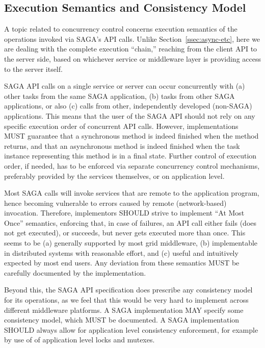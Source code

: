 

  \subsection{Execution Semantics and Consistency Model}

   A topic related to concurrency control concerns execution
   semantics of the operations invoked via SAGA's API calls.
   Unlike Section~\ref{ssec:async-etc}, here we are dealing with
   the complete execution ``chain,'' reaching from the client
   API to the server side, based on whichever service or
   middleware layer is providing access to the server itself.

   SAGA API calls on a single service or server can occur
   concurrently with (a) other tasks from the same SAGA
   application, (b) tasks from other SAGA applications, or also
   (c) calls from other, independently developed (non-SAGA)
   applications.  This means that the user of the SAGA API
   should not rely on any specific execution order of concurrent
   API calls.  However, implementations MUST guarantee that a
   synchronous method is indeed finished when the method
   returns, and that an asynchronous method is indeed finished
   when the task instance representing this method is in
  a final state.  Further control of execution
   order, if needed, has to be enforced via separate concurrency
   control mechanisms, preferably provided by the services
   themselves, or on application level.

   Most SAGA calls will invoke services that are remote to the
   application program, hence becoming vulnerable to errors
   caused by remote (network-based) invocation. Therefore,
   implementors SHOULD strive to implement ``At Most Once''
   semantics, enforcing that, in case of failures, an API call
   either fails (does not get executed), or succeeds, but never
   gets executed more than once.  This seems to be (a) generally
   supported by most grid middleware, (b) implementable
   in distributed systems with reasonable effort, and (c) useful
   and intuitively expected by most end users.  Any deviation
   from these semantics MUST be carefully documented by the
   implementation.

   Beyond this, the SAGA API specification does 
   prescribe any consistency model for its operations, as we
   feel that this would be very hard to implement across
   different middleware platforms.  A SAGA implementation MAY
   specify some consistency model, which MUST be documented.  A
   SAGA implementation SHOULD always allow for application level
   consistency enforcement, for example by use of of application
   level locks and mutexes.



